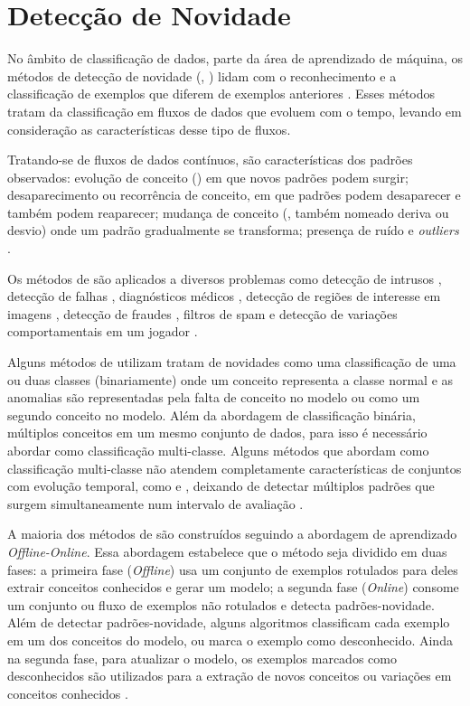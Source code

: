\section{Detecção de Novidade}\label{sec:nd}

No âmbito de classificação de dados, parte da área de aprendizado de máquina, os
métodos de detecção de novidade (\novelty, \nd) lidam com o reconhecimento e a
classificação de exemplos que diferem de exemplos anteriores
\cite{PERNER2007,Gama2010}.
Esses métodos tratam da classificação em fluxos de dados que evoluem com o
tempo, levando em consideração as características desse tipo de fluxos.

Tratando-se de fluxos de dados contínuos, são características
dos padrões observados:
evolução de conceito (\evolution) em que novos padrões podem surgir;
desaparecimento ou recorrência de conceito, em que padrões podem desaparecer e
também podem reaparecer;
mudança de conceito (\drift, também nomeado deriva ou desvio) onde um padrão
gradualmente se transforma;
presença de ruído e \emph{outliers} \cite{Gama2010}.

Os métodos de \nd são aplicados a diversos problemas como
detecção de intrusos \cite{Coull2003,Spinosa2008,Viegas2019,Cassales2019a},
detecção de falhas \cite{Zhang2006},
diagnósticos médicos \cite{Perner2009},
detecção de regiões de interesse em imagens \cite{singh2004approach},
detecção de fraudes \cite{wang2003mining,Abdallah201690}, 
filtros de spam \cite{Hayat2010dct} e
detecção de variações comportamentais em um jogador \cite{Vallim20136258}.

Alguns métodos de \nd utilizam tratam de novidades como uma classificação de uma
ou duas classes (binariamente) onde um conceito representa a classe normal e as anomalias
são representadas pela falta de conceito no modelo ou como um segundo conceito
no modelo.
Além da abordagem de classificação binária, múltiplos conceitos em um mesmo
conjunto de dados, para isso é necessário abordar \nd como classificação
multi-classe.
Alguns métodos que abordam \nd como classificação multi-classe não
atendem completamente características de conjuntos com 
evolução temporal,
como \evolution e \drift, deixando de detectar múltiplos padrões que surgem
simultaneamente num intervalo de avaliação \cite{Faria2016nd,Gama2010}.

A maioria dos métodos de \nd são construídos seguindo a abordagem de aprendizado
\emph{Offline-Online}. Essa abordagem estabelece que o método seja dividido em
duas fases:
a primeira fase (\emph{Offline}) usa um conjunto de exemplos rotulados para
deles extrair conceitos conhecidos e gerar um modelo;
a segunda fase (\emph{Online}) consome um conjunto ou fluxo de exemplos não
rotulados e detecta padrões-novidade.
Além de detectar padrões-novidade, alguns algoritmos classificam cada exemplo
em um dos conceitos do modelo, ou marca o exemplo como desconhecido.
Ainda na segunda fase, para atualizar o modelo, os exemplos marcados como
desconhecidos são utilizados para a extração de novos conceitos ou variações em
conceitos conhecidos \cite{Gama2010}.

